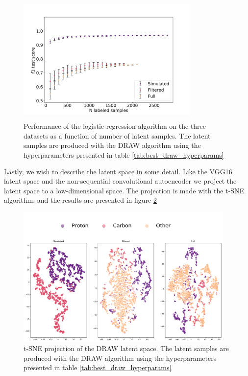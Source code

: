 \begin{figure}
\includegraphics[width=0.8\textwidth, height=6.5cm]{plots/ac_draw_n_samples.pdf}
\caption[Semi supervised classification with DRAW]{Performance of the logistic regression algorithm on the three datasets as a function of number of latent samples. The latent samples are produced with the DRAW algorithm using the hyperparameters presented in table \ref{tab:best_draw_hyperparams}}\label{fig:draw_nsamples}
\end{figure}


Lastly, we wish to describe the latent space in some detail. Like the VGG16 latent space and the non-sequential convolutional autoencoder we project the latent space to a low-dimensional space. The projection is made with the t-SNE algorithm, and the results are presented in figure \ref{fig:draw_tsne}


\begin{figure}
\includegraphics[width=\textwidth, height=7cm]{plots/ac_tsne_draw.pdf}
\caption[t-SNE projection of the DRAW latent space]{t-SNE projection of the DRAW latent space.  The latent samples are produced with the DRAW algorithm using the hyperparameters presented in table \ref{tab:best_draw_hyperparams}}
\label{fig:draw_tsne}
\end{figure}
